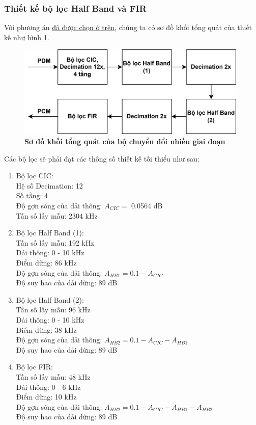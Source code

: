 \subsubsection{Thiết kế bộ lọc Half Band và FIR}
Với phương án \hyperref[choose]{đã được chọn ở trên}, chúng ta có sơ đồ khối tổng quát của thiết kế như hình \ref{pipeline_new}.
\begin{figure}[H]
    \centering
    \includegraphics[width=11cm]{Images/Chuong3/pipeline_new_top.png}
    \caption[Sơ đồ khối tổng quát của bộ chuyển đổi nhiều giai đoạn]{\bfseries \fontsize{12pt}{0pt}\selectfont Sơ đồ khối tổng quát của bộ chuyển đổi nhiều giai đoạn}
    \label{pipeline_new}
\end{figure}
 \noindent Các bộ lọc sẽ phải đạt các thông số thiết kế tối thiểu như sau:
\begin{enumerate}
    \item Bộ lọc CIC: \\
    Hệ số Decimation: 12\\
    Số tầng: 4\\
    Độ gợn sóng của dải thông: $A_{CIC} =$ 0.0564 dB\\
    Tần số lấy mẫu: 2304 kHz
    \item Bộ lọc Half Band (1):\\
    Tần số lấy mẫu: 192 kHz\\
    Dải thông: 0 - 10 kHz\\
    Điểm dừng: 86 kHz\\
    Độ gợn sóng của dải thông: $A_{HB1} = 0.1 - A_{CIC}$\\
    Độ suy hao của dải dừng: 89 dB
    \item Bộ lọc Half Band (2):\\
    Tần số lấy mẫu: 96 kHz\\
    Dải thông: 0 - 10 kHz\\
    Điểm dừng: 38 kHz\\
    Độ gợn sóng của dải thông: $A_{HB2} = 0.1 - A_{CIC} - A_{HB1}$\\
    Độ suy hao của dải dừng: 89 dB
    \item Bộ lọc FIR:\\
    Tần số lấy mẫu: 48 kHz\\
    Dải thông: 0 - 6 kHz\\
    Điểm dừng: 10 kHz\\
    Độ gợn sóng của dải thông: $A_{HB2} = 0.1 - A_{CIC} - A_{HB1} - A_{HB2}$\\
    Độ suy hao của dải dừng: 89 dB
\end{enumerate}

